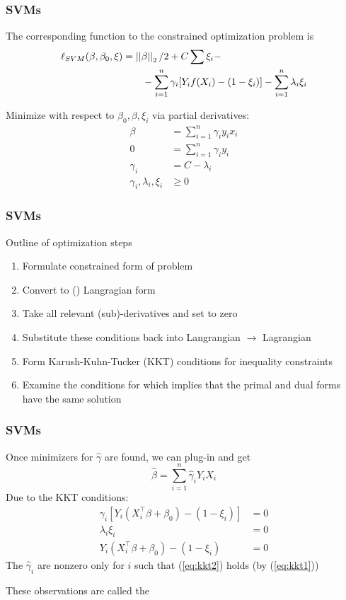 \documentclass[12pt]{beamer}
\begin{document}
\begin{frame}
\frametitle{SVMs}
The corresponding  function to the constrained optimization problem is
\begin{align*}
\ell_{SVM}(\beta,\beta_0,\xi)
 & = 
 \left|\left| \beta \right|\right|_2/2 + C\sum \xi_i - \\
 & \qquad - \sum_{i=1}^n\gamma_i[Y_if(X_i) - (1  - \xi_i)] - \sum_{i=1}^n \lambda_i \xi_i 
\end{align*}

Minimize with respect to $\beta_0,\beta,\xi_i$ via partial derivatives:
\begin{align*}
\beta & = \sum_{i=1}^n  \gamma_i y_ix_i \\
0 & = \sum_{i=1}^n \gamma_iy_i \\
\gamma_i &= C - \lambda_i \\
\gamma_i,\lambda_i,\xi_i & \geq 0
\end{align*}

\end{frame}

\begin{frame}
\frametitle{SVMs}
Outline of optimization steps
\begin{enumerate}
\item Formulate constrained form of problem
\item Convert to () Langragian form
\item Take all relevant (sub)-derivatives and set to zero
\item Substitute these conditions back into  Langrangian $\longrightarrow$  Lagrangian

\item Form Karush-Kuhn-Tucker (KKT) conditions for inequality constraints
\item Examine the conditions for  which implies that the primal and dual forms have the same solution

\end{enumerate}
\end{frame}

\begin{frame}
\frametitle{SVMs}
Once minimizers for $ \hat\gamma$ are found, we can plug-in and get
\[
\hat\beta = \sum_{i=1}^n \hat\gamma_i Y_i X_i
\]
Due to the KKT conditions\Note:
\begin{align}
\gamma_i[Y_i(X_i^{\top} \beta +\beta_0) - (1-\xi_i)] & = 0 \label{eq:kkt1}\\
\lambda_i\xi_i & = 0 \\
Y_i(X_i^{\top} \beta +\beta_0) - (1-\xi_i) & = 0 \label{eq:kkt2}
\end{align}
\vsp
The $\hat\gamma_i$ are nonzero only for $i$ such that (\ref{eq:kkt2}) holds (by (\ref{eq:kkt1}))

\vsp
These observations are called the 

\end{frame}
\end{document}
